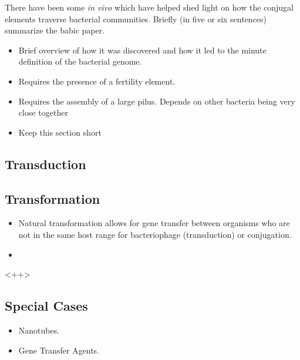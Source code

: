 There have been some \textit{in vivo} which have helped shed light on how the
conjugal elements traverse bacterial communities. Briefly (in five or six
sentences) summarize the babic paper. \cite{Babic:2008bl}

\begin{itemize}

	\item Brief overview of how it was discovered and how it led to the
		minute definition of the bacterial genome.
	\item Requires the presence of a fertility element.
	\item Requires the assembly of a large pilus. Depends on other bacteria
		being very close together
	\item Keep this section short
\end{itemize}

\subsection*{Transduction}
\subsection*{Transformation}
\begin{itemize}
	\item Natural transformation allows for gene transfer between organisms
		who are not in the same host range for bacteriophage
		(transduction) or conjugation.
	\item 
\end{itemize}<++>
\subsection*{Special Cases}
\begin{itemize}
	\item Nanotubes.
	\item Gene Transfer Agents.
\end{itemize}
